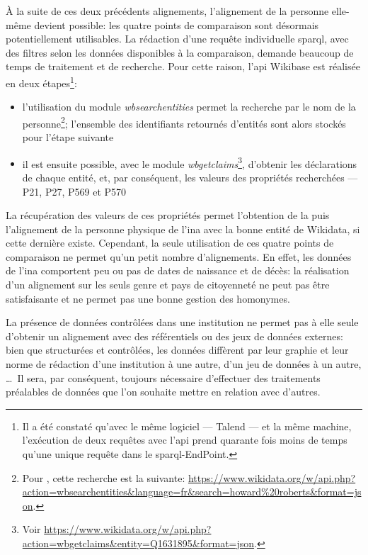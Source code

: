 À la suite de ces deux précédents alignements, l'alignement de la personne elle-même devient possible: les quatre points de comparaison sont désormais potentiellement utilisables. La rédaction d'une requête individuelle \ac{sparql}, avec des filtres selon les données disponibles à la comparaison, demande beaucoup de temps de traitement et de recherche. Pour cette raison, l'\ac{api} Wikibase est réalisée en deux étapes\footnote{Il a été constaté qu'avec le même logiciel --- Talend --- et la même machine, l'exécution de deux requêtes avec l'\ac{api} prend quarante fois moins de temps qu'une unique requête dans le \ac{sparql}-EndPoint.}:
\begin{itemize}
	\item l'utilisation du module \textit{wbsearchentities} permet la recherche par le nom de la personne\footnote{Pour , cette recherche est la suivante: \url{https://www.wikidata.org/w/api.php?action=wbsearchentities\&language=fr\&search=howard\%20roberts\&format=json}.}; l'ensemble des identifiants retournés d'entités sont alors stockés pour l'étape suivante
	\item il est ensuite possible, avec le module \textit{wbgetclaims}\footnote{Voir \url{https://www.wikidata.org/w/api.php?action=wbgetclaims\&entity=Q1631895\&format=json}.}, d'obtenir les déclarations de chaque entité, et, par conséquent, les valeurs des propriétés recherchées --- P21, P27, P569 et P570
\end{itemize}
La récupération des valeurs de ces propriétés permet l'obtention de la  puis l'alignement de la personne physique de l'\ac{ina} avec la bonne entité de Wikidata, si cette dernière existe.
Cependant, la seule utilisation de ces quatre points de comparaison ne permet qu'un petit nombre d'alignements. En effet, les données de l'\ac{ina} comportent peu ou pas de dates de naissance et de décès: la réalisation d'un alignement sur les seuls genre et pays de citoyenneté ne peut pas être satisfaisante et ne permet pas une bonne gestion des homonymes.

\bigskip
\bigskip
La présence de données contrôlées dans une institution ne permet pas à elle seule d'obtenir un alignement avec des référentiels ou des jeux de données externes: bien que structurées et contrôlées, les données diffèrent par leur graphie et leur norme de rédaction d'une institution à une autre, d'un jeu de données à un autre, \dots~Il sera, par conséquent, toujours nécessaire d'effectuer des traitements préalables de données que l'on souhaite mettre en relation avec d'autres.